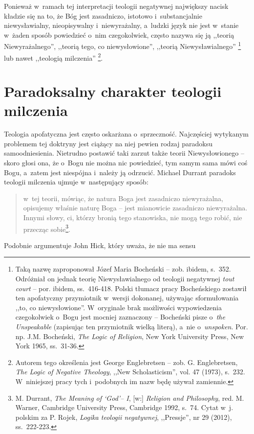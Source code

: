 Ponieważ w~ramach tej interpretacji teologii negatywnej największy nacisk kładzie się na to, że Bóg jest zasadniczo, istotowo i~substancjalnie niewysławialny, nieopisywalny i~niewyrażalny, a~ludzki język nie jest w~stanie w~żaden sposób powiedzieć o~nim czegokolwiek, często nazywa się ją
,,teorią Niewyrażalnego'', ,,teorią tego, co niewysłowione'', ,,teorią Niewysławialnego''%
\footnote{Taką nazwę zaproponował Józef Maria Bocheński -- zob. ibidem, s.~352. Odróżniał on jednak teorię Niewysławialnego od teologii negatywnej \textit{tout court} -- por. ibidem, ss.~416-418. Polski tłumacz pracy Bocheńskiego zostawił ten apofatyczny przymiotnik w~wersji dokonanej, używając sformułowania ,,to, co niewysłowione''. W~oryginale brak możliwości wypowiedzenia czegokolwiek o~Bogu jest mocniej zaznaczony -- Bocheński pisze o~\textit{the Unspeakable} (zapisując ten przymiotnik wielką literą), a~nie o~\textit{unspoken}. Por. np. J.M. Bocheński, \textit{The Logic of Religion}, New York University Press, New York 1965, ss.~31-36.} lub nawet
,,teologią milczenia''%
\footnote{Autorem tego określenia jest George Englebretsen -- zob. G. Englebretsen, \textit{The Logic of Negative Theology}, ,,New Scholasticism'', vol. 47 (1973), s.~232. W~niniejszej pracy
tych i~podobnych im
nazw będę używał zamiennie.
}.


\section{Paradoksalny charakter teologii milczenia}\label{sil-int-par}

Teologia apofatyczna jest często oskarżana o~sprzeczność. Najczęściej wytykanym problemem tej doktryny jest ciążący na niej pewien rodzaj paradoksu samoodniesienia. Nietrudno postawić taki zarzut także teorii Niewysłowionego -- skoro głosi ona, że o~Bogu nie można nic powiedzieć, tym samym sama mówi coś Bogu, a~zatem jest niespójna i~należy ją odrzucić. Michael Durrant paradoks teologii milczenia ujmuje w~następujący sposób:

\begin{quote}
w~tej teorii, mówiąc, że natura Boga jest zasadniczo niewyrażalna, opisujemy właśnie naturę Boga -- jest mianowicie zasadniczo niewyrażalna. Innymi słowy, ci, którzy bronią tego stanowiska, nie mogą tego robić, nie przecząc sobie\footnote{M. Durrant, \textit{The Meaning of ‘God'– I}, [w:] \textit{Religion and Philosophy}, red. M. Warner, Cambridge University Press, Cambridge 1992, s.~74. Cytat w~j. polskim za P. Rojek, \textit{Logika teologii negatywnej}, ,,Pressje'', nr 29 (2012), ss.~222-223.}.

\end{quote}
Podobnie argumentuje John Hick, który uważa, że nie ma sensu

